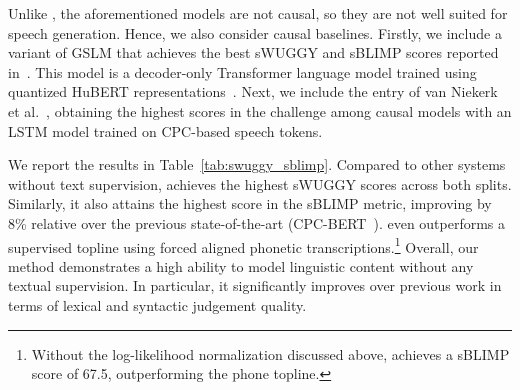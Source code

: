 \documentclass[letterpaper,10 pt]{IEEEtran}
\begin{document}
Unlike \ours{}, the aforementioned models are not causal, so they are not well suited for speech generation. Hence, we also consider causal baselines.  Firstly, we include a variant of GSLM that achieves the best sWUGGY and sBLIMP scores reported in~\cite{lakhotia2021generative}. %
This model is a decoder-only Transformer language model trained using quantized HuBERT representations~\cite{hubert}. Next, we include the entry of van Niekerk et al.~\cite{Niekerk2021}, obtaining the highest scores in the challenge among causal models with an LSTM model trained on CPC-based speech tokens.

We report the results in Table~\ref{tab:swuggy_sblimp}. Compared to other systems without text supervision, \ours{} achieves the highest sWUGGY scores across both splits. Similarly, it also attains the highest score in the sBLIMP metric, improving by 8\% relative over the previous state-of-the-art (CPC-BERT~\cite{nguyentextless2022}). \ours{} even outperforms a supervised topline using forced aligned phonetic transcriptions.\footnote{Without the log-likelihood normalization discussed above, \ours{} achieves a sBLIMP score of 67.5, outperforming the phone topline.} Overall, our method demonstrates a high ability to model linguistic content without any textual supervision. In particular, it significantly improves over previous work in terms of lexical and syntactic judgement quality.
\end{document}
